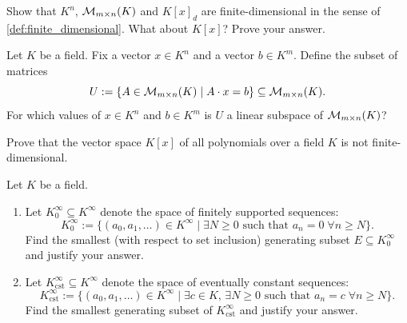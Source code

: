 \begin{exercise}
\label{exc:finite_dimensional_examples}
Show that $K^n$, $\mathcal{M}_{m \times n}(K)$ and $K[x]_d$ are finite-di\-men\-sional in the sense of \cref{def:finite_dimensional}. What about $K[x]$? Prove your answer.
\end{exercise}

\begin{exercise}
\label{exc:matrix_subspace_vector_constraint}
Let $K$ be a field. Fix a vector $x \in K^n$ and a vector $b \in K^m$. Define the subset of matrices
\[
U := \{A \in \mathcal{M}_{m \times n}(K) \mid A \cdot x = b\} \subseteq \mathcal{M}_{m \times n}(K).
\]
For which values of $x \in K^n$ and $b \in K^m$ is $U$ a linear subspace of $\mathcal{M}_{m \times n}(K)$?
\end{exercise}

\begin{exercise}
\label{exc:polynomial_space_infinite_dim}
Prove that the vector space $K[x]$ of all polynomials over a field $K$ is not finite-dimensional.
\end{exercise}

\begin{exercise}
\label{exc:generating_sets_sequences}
Let $K$ be a field.
\begin{enumerate}
    \item Let $K_0^\infty \subseteq K^\infty$ denote the space of finitely supported sequences:
    \[
    K_0^\infty := \{(a_0, a_1, \dots) \in K^\infty \mid \exists N \ge 0 \text{ such that } a_n = 0 \;\forall n \ge N\}.
    \]
    Find the smallest (with respect to set inclusion) generating subset $E \subseteq K_0^\infty$ and justify your answer.
    \item Let $K_{\mathrm{cst}}^\infty \subseteq K^\infty$ denote the space of eventually constant sequences:
    \[
    K_{\mathrm{cst}}^\infty := \{(a_0, a_1, \dots) \in K^\infty \mid \exists c \in K, \, \exists N \ge 0 \text{ such that } a_n = c \;\forall n \ge N\}.
    \]
    Find the smallest generating subset of $K_{\mathrm{cst}}^\infty$ and justify your answer.
\end{enumerate}
\end{exercise}

